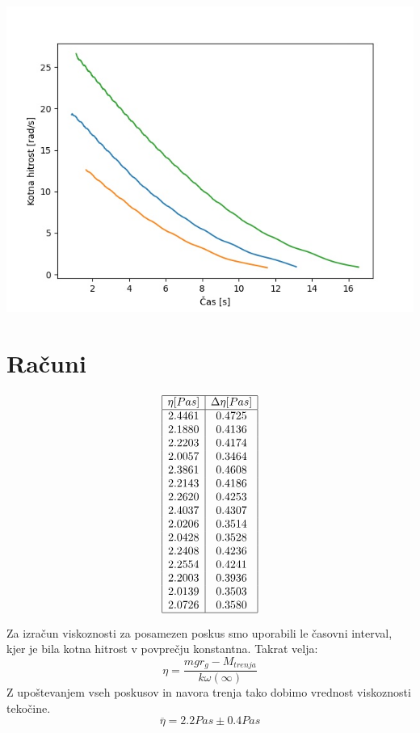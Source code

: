 \documentclass[a4paper]{report}
\begin{document}
\includegraphics[width=\textwidth]{trenje}

\chapter*{Računi}

\[
\begin{array}{|c|c|}\hline
  \eta [Pa s] & \Delta \eta [Pa s] \\ \hline
  2.4461 &  0.4725\\
  2.1880 &  0.4136\\
  2.2203 &  0.4174\\
  2.0057 &  0.3464\\
  2.3861 &  0.4608\\
  2.2143 &  0.4186\\
  2.2620 &  0.4253\\
  2.4037 &  0.4307\\
  2.0206 &  0.3514\\
  2.0428 &  0.3528\\
  2.2408 &  0.4236\\
  2.2554 &  0.4241\\
  2.2003 &  0.3936\\
  2.0139 &  0.3503\\
  2.0726 &  0.3580\\
  \hline
\end{array}
\]

\noindent Za izračun viskoznosti za posamezen poskus smo uporabili le časovni interval, kjer je bila kotna hitrost v povprečju konstantna. Takrat velja:
\[ \eta = \frac{mgr_{g} - M_{trenja}}{k\omega(\infty)} \]
\noindent Z upoštevanjem vseh poskusov in navora trenja tako dobimo vrednost viskoznosti tekočine. 
\[\overline{\eta} =2.2Pas \pm 0.4Pas\]
\end{document}
